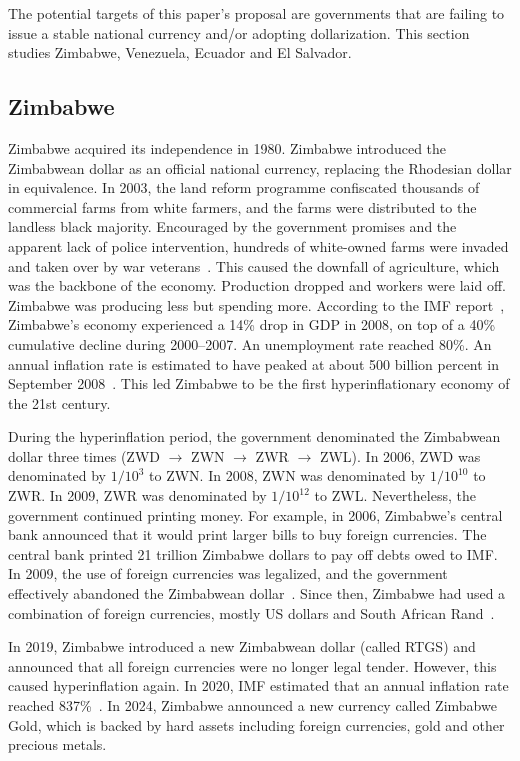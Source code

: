 \documentclass[dvipdfmx,a4paper]{article}
\begin{document}
The potential targets of this paper's proposal are governments that are failing to issue a stable national currency and/or adopting dollarization. This section studies Zimbabwe, Venezuela, Ecuador and El Salvador.

\subsection{Zimbabwe}

Zimbabwe acquired its independence in 1980. Zimbabwe introduced the Zimbabwean dollar as an official national currency, replacing the Rhodesian dollar in equivalence. In 2003, the land reform programme confiscated thousands of commercial farms from white farmers, and the farms were distributed to the landless black majority. Encouraged by the government promises and the apparent lack of police intervention, hundreds of white-owned farms were invaded and taken over by war veterans~\cite{nkomazana2014overview,coomer2011hyperinflation}. This caused the downfall of agriculture, which was the backbone of the economy. Production dropped and workers were laid off. Zimbabwe was producing less but spending more. According to the IMF report~\cite{imf2009zimbabwe}, Zimbabwe's economy experienced a 14\% drop in GDP in 2008, on top of a 40\% cumulative decline during 2000–2007. An unemployment rate reached 80\%. An annual inflation rate is estimated to have peaked at about 500 billion percent in September 2008~\cite{hanke2009measurement}. This led Zimbabwe to be the first hyperinflationary economy of the 21st century.

During the hyperinflation period, the government denominated the Zimbabwean dollar three times (ZWD $\to$ ZWN $\to$ ZWR $\to$ ZWL). In 2006, ZWD was denominated by $1/10^3$ to ZWN. In 2008, ZWN was denominated by $1/10^{10}$ to ZWR. In 2009, ZWR was denominated by $1/10^{12}$ to ZWL. Nevertheless, the government continued printing money. For example, in 2006, Zimbabwe's central bank announced that it would print larger bills to buy foreign currencies. The central bank printed 21 trillion Zimbabwe dollars to pay off debts owed to IMF. In 2009, the use of foreign currencies was legalized, and the government effectively abandoned the Zimbabwean dollar~\cite{kramarenko2010zimbabwe}. Since then, Zimbabwe had used a combination of foreign currencies, mostly US dollars and South African Rand~\cite{coomer2011hyperinflation}.

In 2019, Zimbabwe introduced a new Zimbabwean dollar (called RTGS) and announced that all foreign currencies were no longer legal tender. However, this caused hyperinflation again. In 2020, IMF estimated that an annual inflation rate reached 837\%~\cite{imf2022zimbabwe}. In 2024, Zimbabwe announced a new currency called Zimbabwe Gold, which is backed by hard assets including foreign currencies, gold and other precious metals.
\end{document}
